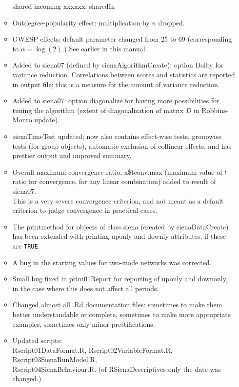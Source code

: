 \documentclass[a4paper,fleqn,11pt]{article}
\newcommand{\+}{\, + \,}
\newcommand{\sfn}[1]{\textsf{#1}}
\begin{document}
\begin{small}
\begin{itemize}
\begin{itemize}
		shared incoming xxxxxx, \sfn{sharedIn}
	\item Outdegree-popularity effect: multiplication by $n$ dropped.
	\item GWESP effects: default parameter changed from 25 to 69
		(corresponding to $\alpha = \log(2)$.) See earlier in this manual.
	\item Added to \textsf{siena07} (defined by \textsf{sienaAlgorithmCreate}):
		option \sfn{Dolby} for variance reduction.
		Correlations between scores and statistics are reported in output file;
		this is a measure for the amount of variance reduction.
	\item Added to \textsf{siena07}:
		option \sfn{diagonalize} for having more possibilities for
		tuning the algorithm
		(extent of diagonalization of matrix $D$ in Robbins-Monro update).
	\item \sfn{sienaTimeTest} updated; now also contains effect-wise tests,
		groupwise tests (for group objects), automatic exclusion of
		collinear effects, and has prettier output and improved	summary.
	\item Overall maximum convergence ratio, \sfn{x\$tconv.max}
		(maximum value of $t$-ratio for convergence, for any linear combination)
		added to result of \textsf{siena07}.\\
        This is a very severe convergence criterion, and not meant as a default
        criterion to judge convergence in practical cases.
	\item The \textsf{print}method for objects of class \sfn{siena} (created by
        \textsf{sienaDataCreate})
		has been extended with printing \sfn{uponly} and \sfn{downly} attributes,
		if these are \texttt{TRUE}.
	\item A bug in the starting values for two-mode networks was corrected.
	\item Small bug fixed in \sfn{print01Report} for reporting of \sfn{uponly}
        and \sfn{downonly},
		in the case where this does not affect all periods.
	\item Changed almost all \sfn{.Rd} documentation files: sometimes to make them
		better understandable or complete, sometimes to make more appropriate
		examples, sometimes only minor prettifications.
	\item Updated scripts:\\
		Rscript01DataFormat.R, Rscript02VariableFormat.R,
 	 	Rscript03SienaRunModel.R,\\
 	 	Rscript04SienaBehaviour.R.
		(of RSienaDescriptives only the date was changed.)
  \end{itemize}


\end{itemize}
\end{small}
\end{document}
